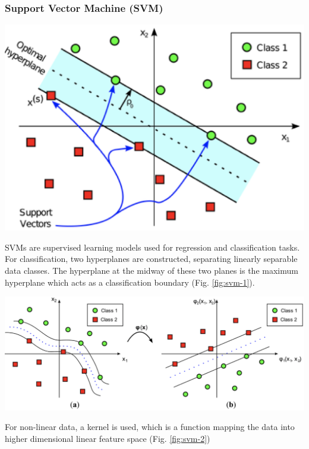 \documentclass[a4paper, 12pt]{article}
\begin{document}
\subsubsection{Support Vector Machine (SVM)}
\begin{center}
\includegraphics[scale=0.2]{svm - paper.png}
\label{fig:svm-1}
\end{center}

\noindent SVMs are supervised learning models used for regression and classification tasks. For classification, two hyperplanes are constructed, separating linearly separable data classes. The hyperplane at the midway of these two planes is the maximum hyperplane which acts as a classification boundary (Fig. \ref{fig:svm-1}).

\vskip 0.2in
\begin{center}
\includegraphics[scale=0.3]{kernel mapping.png}
\label{fig:svm-2}
\end{center}
\noindent 
For non-linear data, a kernel is used, which is a function mapping the data into higher dimensional linear feature space (Fig. \ref{fig:svm-2})
\end{document}
